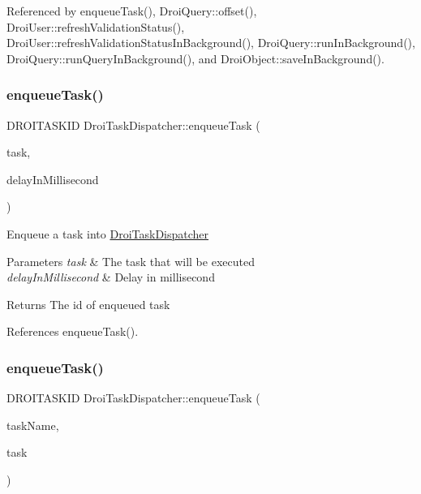 Referenced by enqueue\+Task(), Droi\+Query\+::offset(), Droi\+User\+::refresh\+Validation\+Status(), Droi\+User\+::refresh\+Validation\+Status\+In\+Background(), Droi\+Query\+::run\+In\+Background(), Droi\+Query\+::run\+Query\+In\+Background(), and Droi\+Object\+::save\+In\+Background().

\mbox{\label{class_droi_task_dispatcher_abe9f9b40bc6bf45b6cbfd4c77477bbd8}} 
\subsubsection{\texorpdfstring{enqueue\+Task()}{enqueueTask()}\hspace{0.1cm}{\footnotesize\ttfamily [2/4]}}
{\footnotesize\ttfamily D\+R\+O\+I\+T\+A\+S\+K\+ID Droi\+Task\+Dispatcher\+::enqueue\+Task (\begin{DoxyParamCaption}\item[{const D\+R\+O\+I\+T\+A\+SK \&}]{task,  }\item[{int}]{delay\+In\+Millisecond }\end{DoxyParamCaption})}

Enqueue a task into \hyperlink{class_droi_task_dispatcher}{Droi\+Task\+Dispatcher} 
\begin{DoxyParams}{Parameters}
{\em task} & The task that will be executed \\
\hline
{\em delay\+In\+Millisecond} & Delay in millisecond \\
\hline
\end{DoxyParams}
\begin{DoxyReturn}{Returns}
The id of enqueued task 
\end{DoxyReturn}


References enqueue\+Task().

\mbox{\label{class_droi_task_dispatcher_aa46d3152580896756a09212f84132a41}} 
\subsubsection{\texorpdfstring{enqueue\+Task()}{enqueueTask()}\hspace{0.1cm}{\footnotesize\ttfamily [3/4]}}
{\footnotesize\ttfamily D\+R\+O\+I\+T\+A\+S\+K\+ID Droi\+Task\+Dispatcher\+::enqueue\+Task (\begin{DoxyParamCaption}\item[{const std\+::string \&}]{task\+Name,  }\item[{const D\+R\+O\+I\+T\+A\+SK \&}]{task }\end{DoxyParamCaption})}

